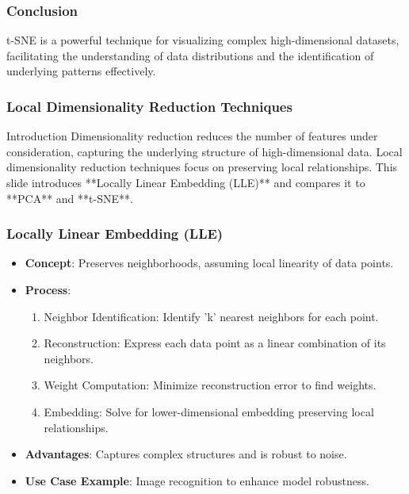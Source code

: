 \documentclass[aspectratio=169]{beamer}
\begin{document}
\begin{frame}[fragile]
  \frametitle{Conclusion}
  t-SNE is a powerful technique for visualizing complex high-dimensional datasets, facilitating the understanding of data distributions and the identification of underlying patterns effectively.
\end{frame}

\begin{frame}[fragile]
    \frametitle{Local Dimensionality Reduction Techniques}
    \begin{block}{Introduction}
        Dimensionality reduction reduces the number of features under consideration, capturing the underlying structure of high-dimensional data. 
        Local dimensionality reduction techniques focus on preserving local relationships. This slide introduces **Locally Linear Embedding (LLE)** and compares it to **PCA** and **t-SNE**.
    \end{block}
\end{frame}

\begin{frame}[fragile]
    \frametitle{Locally Linear Embedding (LLE)}
    \begin{itemize}
        \item \textbf{Concept}: Preserves neighborhoods, assuming local linearity of data points.
        \item \textbf{Process}:
        \begin{enumerate}
            \item Neighbor Identification: Identify 'k' nearest neighbors for each point.
            \item Reconstruction: Express each data point as a linear combination of its neighbors.
            \item Weight Computation: Minimize reconstruction error to find weights.
            \item Embedding: Solve for lower-dimensional embedding preserving local relationships.
        \end{enumerate}
        \item \textbf{Advantages}: Captures complex structures and is robust to noise.
        \item \textbf{Use Case Example}: Image recognition to enhance model robustness.
    \end{itemize}
\end{frame}
\end{document}
